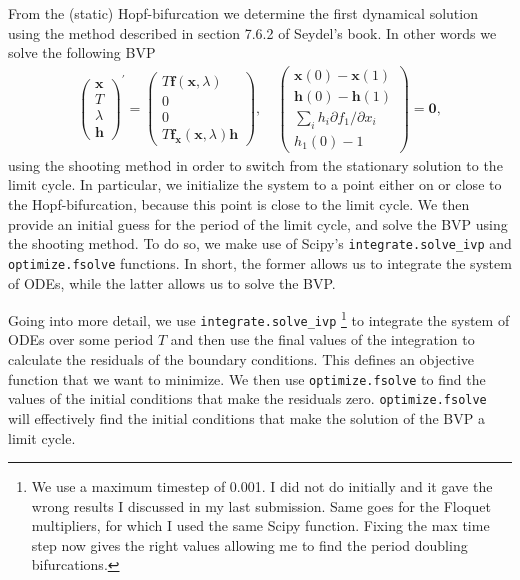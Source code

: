 From the (static) Hopf-bifurcation we determine the first dynamical solution using the method described in 
section 7.6.2 of Seydel's book. In other words we solve the following BVP 
\begin{align}
    \left(\begin{array}{l}
        \mathbf{x} \\
        T \\
        \lambda \\
        \mathbf{h}
        \end{array}\right)^{\prime}=\left(\begin{array}{c}
        T \mathbf{f}(\mathbf{x}, \lambda) \\
        0 \\
        0 \\
        T \mathbf{f}_{\mathbf{x}}(\mathbf{x}, \lambda) \mathbf{h}
        \end{array}\right), \quad\left(\begin{array}{c}
        \mathbf{x}(0)-\mathbf{x}(1) \\
        \mathbf{h}(0)-\mathbf{h}(1) \\
        \sum_i h_i \partial f_1 / \partial x_i \\
        h_1(0)-1
        \end{array}\right)=\mathbf{0},
\end{align}
using the shooting method in order to switch from the stationary solution to the limit cycle. In particular, we initialize the system 
to a point either on or close to the Hopf-bifurcation, because this point is close to the limit cycle. We then provide an initial guess for the 
period of the limit cycle, and solve the BVP using the shooting method. To do so, we make use of Scipy's \lstinline|integrate.solve_ivp| and \lstinline|optimize.fsolve| functions.
In short, the former allows us to integrate the system of ODEs, while the latter allows us to solve the BVP. 

Going into more detail, we use \lstinline|integrate.solve_ivp| 
\footnote{We use a maximum timestep of 0.001. I did not do initially and it gave the 
wrong results I discussed in my last submission. Same goes for the Floquet multipliers, for which
I used the same Scipy function. Fixing the max time step now gives the right values allowing me to find
the period doubling bifurcations.}
to integrate the system of ODEs over some period $T$ and then use the final values of the integration to calculate the residuals of the boundary conditions.
This defines an objective function that we want to minimize. We then use \lstinline|optimize.fsolve| to find the values of the initial conditions that make the residuals zero. \lstinline|optimize.fsolve| will 
effectively find the initial conditions that make the solution of the BVP a limit cycle.

